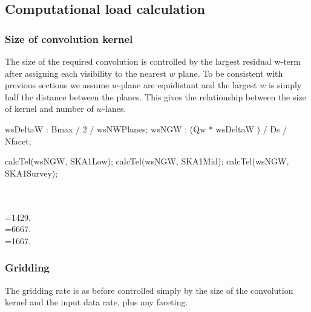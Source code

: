 \documentclass[useAMS,usenatbib,referee]{article}
\begin{document}
\subsection{Computational load calculation}


\subsubsection{Size of convolution kernel}

The size of the required convolution is controlled by the largest
residual w-term after assigning each visibility to the nearest $w$
plane. To be consistent with previous sections we assume $w$-plane are
equidistant and the largest $w$ is simply half the distance between
the planes.  This gives the relationship between the size of kernel
and number of $w$-lanes.

\begin{maxima}[]
wsDeltaW : Bmax / 2 / wsNWPlanes;
wsNGW :  (Qw * wsDeltaW ) / Ds / Nfacet;

calcTel(wsNGW, SKA1Low);
calcTel(wsNGW, SKA1Mid);
calcTel(wsNGW, SKA1Survey);

\maximaoutput*
{} \\
 \\
\m  {}={{1429.}} \\
\m  {}={{6667.}} \\
\m  {}={{1667.}} \\
\end{maxima}

\subsubsection{Gridding}

The gridding rate is as before controlled simply by the size of the
convolution kernel and the input data rate, plus any faceting.
\end{document}
